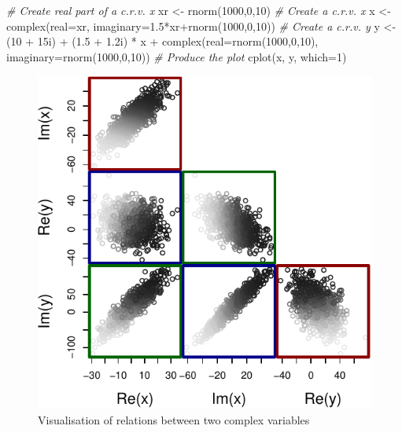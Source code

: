 \documentclass[
]{book}
\newenvironment{Shaded}{\begin{snugshade}}{\end{snugshade}}
\newcommand{\AttributeTok}[1]{\textcolor[rgb]{0.77,0.63,0.00}{#1}}
\newcommand{\CommentTok}[1]{\textcolor[rgb]{0.56,0.35,0.01}{\textit{#1}}}
\newcommand{\DecValTok}[1]{\textcolor[rgb]{0.00,0.00,0.81}{#1}}
\newcommand{\FloatTok}[1]{\textcolor[rgb]{0.00,0.00,0.81}{#1}}
\newcommand{\FunctionTok}[1]{\textcolor[rgb]{0.00,0.00,0.00}{#1}}
\newcommand{\NormalTok}[1]{#1}
\newcommand{\OtherTok}[1]{\textcolor[rgb]{0.56,0.35,0.01}{#1}}
\newcommand{\SpecialCharTok}[1]{\textcolor[rgb]{0.00,0.00,0.00}{#1}}
\begin{document}
\begin{Shaded}
\begin{Highlighting}[]
\CommentTok{\# Create real part of a c.r.v. x}
\NormalTok{xr }\OtherTok{\textless{}{-}} \FunctionTok{rnorm}\NormalTok{(}\DecValTok{1000}\NormalTok{,}\DecValTok{0}\NormalTok{,}\DecValTok{10}\NormalTok{)}
\CommentTok{\# Create a c.r.v. x}
\NormalTok{x }\OtherTok{\textless{}{-}} \FunctionTok{complex}\NormalTok{(}\AttributeTok{real=}\NormalTok{xr, }\AttributeTok{imaginary=}\FloatTok{1.5}\SpecialCharTok{*}\NormalTok{xr}\SpecialCharTok{+}\FunctionTok{rnorm}\NormalTok{(}\DecValTok{1000}\NormalTok{,}\DecValTok{0}\NormalTok{,}\DecValTok{10}\NormalTok{))}
\CommentTok{\# Create a c.r.v. y}
\NormalTok{y }\OtherTok{\textless{}{-}}\NormalTok{ (}\DecValTok{10} \SpecialCharTok{+}\NormalTok{ 15i) }\SpecialCharTok{+}\NormalTok{ (}\FloatTok{1.5} \SpecialCharTok{+} \FloatTok{1.2}\NormalTok{i) }\SpecialCharTok{*}\NormalTok{ x }\SpecialCharTok{+}
    \FunctionTok{complex}\NormalTok{(}\AttributeTok{real=}\FunctionTok{rnorm}\NormalTok{(}\DecValTok{1000}\NormalTok{,}\DecValTok{0}\NormalTok{,}\DecValTok{10}\NormalTok{), }\AttributeTok{imaginary=}\FunctionTok{rnorm}\NormalTok{(}\DecValTok{1000}\NormalTok{,}\DecValTok{0}\NormalTok{,}\DecValTok{10}\NormalTok{))}
\CommentTok{\# Produce the plot}
\FunctionTok{cplot}\NormalTok{(x, y, }\AttributeTok{which=}\DecValTok{1}\NormalTok{)}
\end{Highlighting}
\end{Shaded}

\begin{figure}
\centering
\includegraphics{Svetunkov---Svetunkov---Complex-Dynamic-Models_files/figure-latex/crvScatterplots-1.pdf}
\caption{\label{fig:crvScatterplots}Visualisation of relations between two complex variables}
\end{figure}
\end{document}
